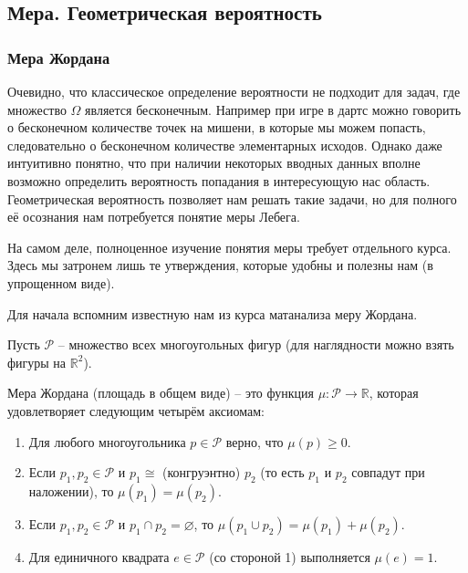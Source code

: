 \subsection{Мера. Геометрическая вероятность}
\subsubsection{Мера Жордана}
Очевидно, что классическое определение вероятности не подходит для задач, где множество $\Omega$ является бесконечным. Например при игре в дартс можно говорить о бесконечном количестве точек на мишени, в которые мы можем попасть, следовательно о бесконечном количестве элементарных исходов. Однако даже интуитивно понятно, что при наличии некоторых вводных данных вполне возможно определить вероятность попадания в интересующую нас область.\\
Геометрическая вероятность позволяет нам решать такие задачи, но для полного её осознания нам потребуется понятие меры Лебега.\\
\begin{notice}На самом деле, полноценное изучение понятия меры требует отдельного курса. Здесь мы затронем лишь те утверждения, которые удобны и полезны нам (в упрощенном виде).
\end{notice}
\medskip
Для начала вспомним известную нам из курса матанализа меру Жордана.

\begin{definition}
Пусть $\mathcal{P}$ -- множество всех многоугольных фигур (для наглядности можно взять фигуры на $\mathbb{R}^2$).

Мера Жордана (площадь в общем виде) -- это функция $\mu: \mathcal{P} \to \mathbb{R}$, которая удовлетворяет следующим четырём аксиомам:
\begin{enumerate}
    \item Для любого многоугольника $p \in \mathcal{P}$ верно, что $\mu(p) \ge 0$.
    
    \item Если $p_1, p_2 \in \mathcal{P}$ и $p_1 \cong$ (конгруэнтно) $p_2$ (то есть $p_1$ и $p_2$ совпадут при наложении), то $\mu(p_1) = \mu(p_2)$.
    
    \item Если $p_1, p_2 \in \mathcal{P}$ и  $p_1 \cap p_2 = \varnothing$, то
     $\mu(p_1 \cup p_2) = \mu(p_1) + \mu(p_2).$
    
    \item Для единичного квадрата $e \in \mathcal{P}$ (со стороной 1) выполняется $\mu(e) = 1$.
\end{enumerate}
\end{definition}


